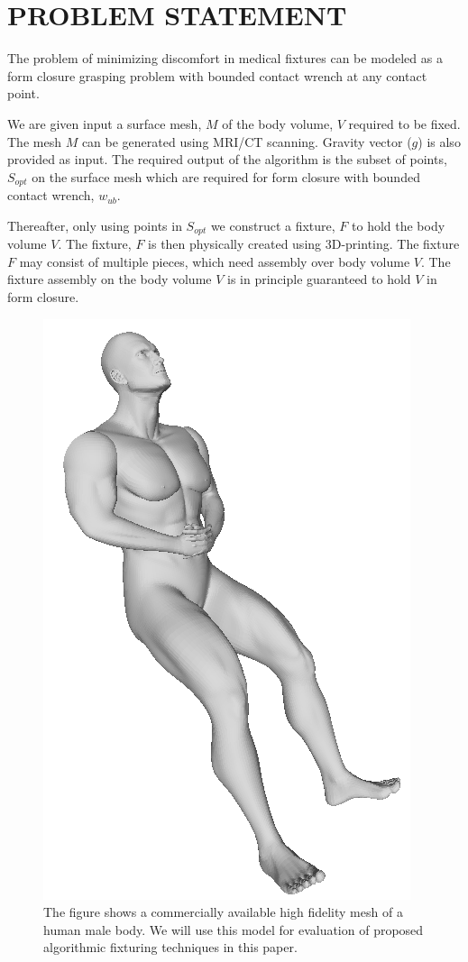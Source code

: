 
\section{PROBLEM STATEMENT}
\label{sec:problemStatement}

The problem of minimizing discomfort in medical fixtures can be modeled as a 
form closure grasping problem with bounded contact wrench at any contact point.

We are given input a surface mesh, $M$ of the body volume, $V$ required to be 
fixed. The mesh $M$ can be generated using MRI/CT scanning. Gravity vector ($g$) is also provided as input. The required output
 of the algorithm is the subset of points, $S_{opt}$ on the surface mesh which 
 are required for form closure with bounded contact wrench, $w_{ub}$. 

Thereafter, only using points in $S_{opt}$ we construct a fixture, $F$ to hold the 
body volume $V$. The fixture, $F$ is then physically created using 3D-printing. 
The fixture $F$ may consist of multiple pieces, which need assembly over body 
volume $V$. The fixture assembly on the body volume $V$ is in principle 
guaranteed to hold $V$ in form closure. 

\begin{figure}[t!]
  \begin{center}
    \includegraphics[width=0.6\linewidth]{images/maleBody}
  \end{center}
  \vspace{-10pt}
\caption{ The figure shows a commercially available high fidelity mesh of a human male body. We will use this model for evaluation of proposed algorithmic fixturing techniques in this paper.}
  \vspace*{-15pt}
  \label{fig:maleBody}
\end{figure}


